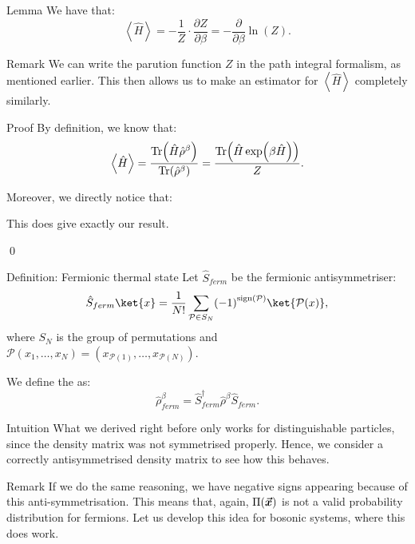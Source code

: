 \documentclass[a4paper]{article}
\begin{document}
\begin{parag}{Lemma}
    We have that: 
    \[\left\langle \hat{H} \right\rangle = -\frac{1}{Z}\cdot \frac{\partial Z}{\partial \beta} = - \frac{\partial}{\partial \beta} \ln\left(Z\right).\]

    \begin{subparag}{Remark}
        We can write the parution function $Z$ in the path integral formalism, as mentioned earlier. This then allows us to make an estimator for $\left\langle \hat{H} \right\rangle$ completely similarly.
    \end{subparag}
    
    \begin{subparag}{Proof}
        By definition, we know that: 
        \[\left\langle \hat{H} \right\rangle = \frac{\Tr\left(\hat{H} \hat{\rho}^{\beta}\right)}{\Tr\left(\hat{\rho}^{\beta}\right)} = \frac{\Tr\left(\hat{H} \exp\left(\beta \hat{H}\right)\right)}{Z}.\]
        
        Moreover, we directly notice that:

        This does give exactly our result.

        \qed
    \end{subparag}
\end{parag}


\begin{parag}{Definition: Fermionic thermal state}
    Let $\hat{S}_{ferm}$ be the fermionic antisymmetriser:
    \[\hat{S}_{ferm} \ket{x} = \frac{1}{N!} \sum_{\mathcal{P} \in S_N} \left(-1\right)^{\text{sign}\left(\mathcal{P}\right)} \ket{\mathcal{P}\left(x\right)},\]
    where $S_N$ is the group of permutations and $\mathcal{P}\left(x_1, \ldots, x_N\right) = \left(x_{\mathcal{P}\left(1\right)}, \ldots, x_{\mathcal{P}\left(N\right)}\right)$.

    We define the  as: 
    \[\hat{\rho}^{\beta}_{ferm} = \hat{S}_{ferm}^{\dagger} \hat{\rho}^{\beta} \hat{S}_{ferm}.\]
    
    \begin{subparag}{Intuition}
        What we derived right before only works for distinguishable particles, since the density matrix was not symmetrised properly. Hence, we consider a correctly antisymmetrised density matrix to see how this behaves.
    \end{subparag}

    \begin{subparag}{Remark}
        If we do the same reasoning, we have negative signs appearing because of this anti-symmetrisation. This means that, again, $\Pi\left(\bvec{x}\right)$ is not a valid probability distribution for fermions. Let us develop this idea for bosonic systems, where this does work.
    \end{subparag}
\end{parag}
\end{document}
